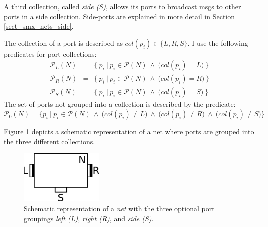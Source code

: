 A third collection, called \emph{side (S)}, allows its ports to broadcast \glspl*{msg} to other ports in a side collection.
Side-ports are explained in more detail in Section \ref{sect_smx_nets_side}.

The collection of a port is described as $col(p_i) \in \{ \mathit{L}, \mathit{R}, \mathit{S} \}$.
I use the following predicates for port collections:
\begin{eqnarray}
    \label{eq_smx_port_left}
    \mathcal{P}_L(N) &=& \{\ p_i\ |\ p_i \in \mathcal{P}(N)\ \land\ \big ( col( p_i ) = \mathit{L} \big )\ \} \\
    \label{eq_smx_port_right}
    \mathcal{P}_R(N) &=& \{\ p_i\ |\ p_i \in \mathcal{P}(N)\ \land\ \big ( col( p_i ) = \mathit{R} \big )\ \} \\
    \label{eq_smx_port_side}
    \mathcal{P}_S(N) &=& \{\ p_i\ |\ p_i \in \mathcal{P}(N)\ \land\ \big ( col( p_i ) = \mathit{S} \big )\ \}
\end{eqnarray}
The set of ports not grouped into a collection is described by the predicate:
\begin{equation}
    \mathcal{P}_0(N) = \Big \{ p_i\ |\ p_i \in \mathcal{P}(N)\ \land \ \big ( col(p_i) \neq \mathit{L} \big ) \ \land \ \big ( col(p_i) \neq \mathit{R} \big ) \ \land \ \big ( col( p_i ) \neq \mathit{S} \big ) \Big \}
\label{eq_smx_port_no_class}
\end{equation}

Figure \ref{fig_smx_box} depicts a schematic representation of a net where ports are grouped into the three different collections.
\begin{figure}[bht]
    \TopFigSpace
    \centering
    \includegraphics[width=4cm]{fig/net.pdf}
    \CaptionFigSpace
    \caption{Schematic representation of a \emph{net} with the three optional port groupings \emph{left (L)}, \emph{right (R)}, and \emph{side (S)}.}
    \label{fig_smx_box}
    \BotFigSpace
\end{figure}


